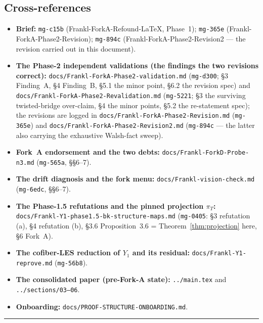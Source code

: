 \documentclass[11pt,oneside]{amsart}
\theoremstyle{plain}
\theoremstyle{definition}
\theoremstyle{remark}
\theoremstyle{honeststyle}
\begin{document}
\subsection{Cross-references}
\label{ssec:xref}

\begin{itemize}[leftmargin=1.7em]
\item \textbf{Brief:} \texttt{mg-c15b} (Frankl-ForkA-Refound-LaTeX,
  Phase~1); \texttt{mg-365e} (Frankl-ForkA-Phase2-Revision);
  \texttt{mg-894c} (Frankl-ForkA-Phase2-Revision2 --- the revision
  carried out in this document).
\item \textbf{The Phase-2 independent validations (the findings the
  two revisions correct):}
  \texttt{docs/Frankl-ForkA-Phase2-validation.md} (\texttt{mg-d300};
  \S3 Finding~A, \S4 Finding~B, \S5.1 the minor point, \S6.2 the
  revision spec) and
  \texttt{docs/Frankl-ForkA-Phase2-Revalidation.md} (\texttt{mg-5221};
  \S3 the surviving twisted-bridge over-claim, \S4 the minor points,
  \S5.2 the re-statement spec); the revisions are logged in
  \texttt{docs/Frankl-ForkA-Phase2-Revision.md} (\texttt{mg-365e})
  and \texttt{docs/Frankl-ForkA-Phase2-Revision2.md}
  (\texttt{mg-894c} --- the latter also carrying the exhaustive
  Walsh-fact sweep).
\item \textbf{Fork~A endorsement and the two debts:}
  \texttt{docs/Frankl-ForkD-Probe-n3.md} (\texttt{mg-565a}, \S\S6--7).
\item \textbf{The drift diagnosis and the fork menu:}
  \texttt{docs/Frankl-vision-check.md} (\texttt{mg-6edc}, \S\S6--7).
\item \textbf{The Phase-1.5 refutations and the pinned projection
  $\pi_T$:} \texttt{docs/Frankl-Y1-phase1.5-bk-structure-maps.md}
  (\texttt{mg-0405}: \S3 refutation (a), \S4 refutation (b), \S3.6
  Proposition~3.6 = Theorem~\ref{thm:projection} here, \S6 Fork~A).
\item \textbf{The cofiber-LES reduction of $Y_1$ and its residual:}
  \texttt{docs/Frankl-Y1-reprove.md} (\texttt{mg-56b8}).
\item \textbf{The consolidated paper (pre-Fork-A state):}
  \texttt{../main.tex} and \texttt{../sections/03--06}.
\item \textbf{Onboarding:} \texttt{docs/PROOF-STRUCTURE-ONBOARDING.md}.
\end{itemize}

\bigskip
\noindent\rule{\textwidth}{0.4pt}
\end{document}
